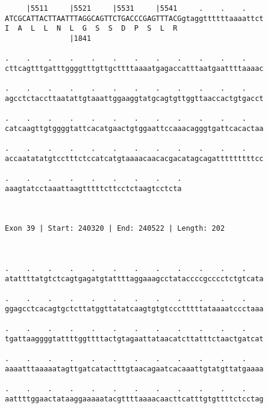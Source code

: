 \documentclass{article}
\begin{document}
\begin{Verbatim}
     |5511     |5521     |5531     |5541     .    .    .    
ATCGCATTACTTAATTTAGGCAGTTCTGACCCGAGTTTACGgtaggttttttaaaattct
I  A  L  L  N  L  G  S  S  D  P  S  L  R                    
               |1841                                        
  
.    .    .    .    .    .    .    .    .    .    .    .    
cttcagtttgatttggggtttgttgcttttaaaatgagaccatttaatgaattttaaaac
                                                            
.    .    .    .    .    .    .    .    .    .    .    .    
agcctctaccttaatattgtaaattggaaggtatgcagtgttggttaaccactgtgacct
                                                            
.    .    .    .    .    .    .    .    .    .    .    .    
catcaagttgtggggtattcacatgaactgtggaattccaaacagggtgattcacactaa
                                                            
.    .    .    .    .    .    .    .    .    .    .    .    
accaatatatgtcctttctccatcatgtaaaacaacacgacatagcagatttttttttcc
                                                            
.    .    .    .    .    .    .    .    .
aaagtatcctaaattaagtttttcttcctctaagtcctcta
                                         
                                         
 
Exon 39 | Start: 240320 | End: 240522 | Length: 202



.    .    .    .    .    .    .    .    .    .    .    .    
atattttatgtctcagtgagatgtattttaggaaagcctataccccgcccctctgtcata
                                                            
.    .    .    .    .    .    .    .    .    .    .    .    
ggagcctcacagtgctcttatggttatatcaagtgtgtccctttttataaaatccctaaa
                                                            
.    .    .    .    .    .    .    .    .    .    .    .    
tgattaaggggtattttggttttactgtagaattataacatcttatttctaactgatcat
                                                            
.    .    .    .    .    .    .    .    .    .    .    .    
aaaatttaaaaatagttgatcatactttgtaacagaatcacaaattgtatgttatgaaaa
                                                            
.    .    .    .    .    .    .    .    .    .    .    .    
aattttggaactataaggaaaaatacgttttaaaacaacttcatttgtgttttctcctag
                                                            

\end{Verbatim}
\end{document}
